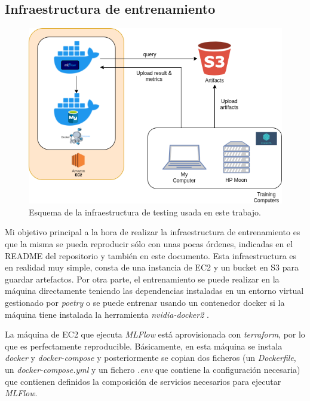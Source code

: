 \subsection{Infraestructura de entrenamiento}

\begin{figure}[H]
	\includegraphics[width=1.\linewidth]{imagenes/05_Implementacion/traininfra.png}
	\centering
	\caption{Esquema de la infraestructura de testing usada en este trabajo.}
\end{figure}

Mi objetivo principal a la hora de realizar la infraestructura de entrenamiento es que la misma se pueda reproducir sólo con unas pocas órdenes, indicadas en el README del repositorio y también en este documento. Esta infraestructura es en realidad muy simple, consta de una instancia de EC2 y un bucket en S3 para guardar artefactos. Por otra parte, el entrenamiento se puede realizar en la máquina directamente teniendo las dependencias instaladas en un entorno virtual gestionado por \textit{poetry} o se puede entrenar usando un contenedor docker si la máquina tiene instalada la herramienta \textit{nvidia-docker2} \cite{nvidiadocker}.\newline

La máquina de EC2 que ejecuta \textit{MLFlow} está aprovisionada con \textit{terraform}, por lo que es perfectamente reproducible. Básicamente, en esta máquina se instala \textit{docker} y \textit{docker-compose} y posteriormente se copian dos ficheros (un \textit{Dockerfile}, un \textit{docker-compose.yml} y un fichero \textit{.env} que contiene la configuración necesaria) que contienen definidos la composición de servicios necesarios para ejecutar \textit{MLFlow}.\newline

